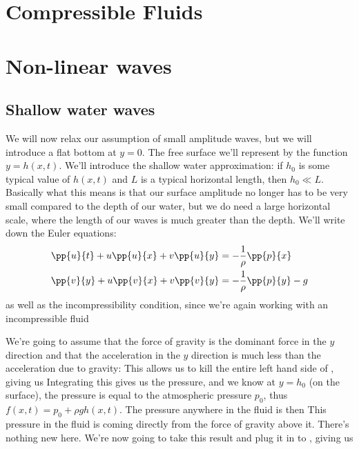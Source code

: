 \documentclass[12pt]{book}
\begin{document}
\chapter{Compressible Fluids}


\chapter{Non-linear waves}
\section{Shallow water waves}

We will now relax our assumption of small amplitude waves, but we will introduce a flat bottom at $y=0$.  The free surface we'll represent by the function $y=h(x,t)$.  We'll introduce the shallow water approximation:  if $h_0$ is some typical value of $h(x,t)$ and $L$ is a typical horizontal length, then $h_0 \ll L$.  Basically what this means is that our surface amplitude no longer has to be very small compared to the depth of our water, but we do need a large horizontal scale, where the length of our waves is much greater than the depth.  We'll write down the Euler equations:
\begin{align}
\pp{u}{t} + u\pp{u}{x} + v\pp{u}{y} &= -\frac{1}{\rho}\pp{p}{x} \label{29088417293461928346192834}\\
\pp{v}{y} + u\pp{v}{x} + v\pp{v}{y} &= -\frac{1}{\rho}\pp{p}{y} - g \label{219057239582709601}
\end{align}
as well as the incompressibility condition, since we're again working with an incompressible fluid

We're going to assume that the force of gravity is the dominant force in the $y$ direction and that the acceleration in the $y$ direction is much less than the acceleration due to gravity:
This allows us to kill the entire left hand side of , giving us 
Integrating this gives us the pressure,
and we know at $y=h_0$ (on the surface), the pressure is equal to the atmospheric pressure $p_0$, thus
$f(x,t) = p_0 + \rho g h(x,t)$.  The pressure anywhere in the fluid is then
  This pressure in the fluid is coming directly from the force of gravity above it. There's nothing new here.  We're now going to take this result and plug it in to , giving us
\end{document}
